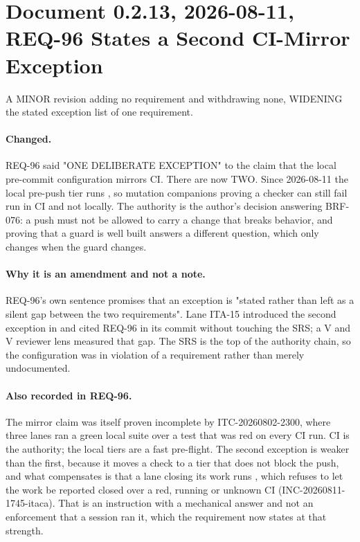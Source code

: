 \section*{Document 0.2.13, 2026-08-11, REQ-96 States a Second CI-Mirror Exception}

A MINOR revision adding no requirement and withdrawing none, WIDENING the
stated exception list of one \stable{} requirement.

\paragraph{Changed.} REQ-96 said "ONE DELIBERATE EXCEPTION" to the
claim that the local pre-commit configuration mirrors CI. There are now
TWO. Since 2026-08-11 the local pre-push tier runs , so mutation companions proving a checker can still fail run
in CI and not locally. The authority is the author's decision answering
BRF-076: a push must not be allowed to carry a change that breaks
behavior, and proving that a guard is well built answers a different
question, which only changes when the guard changes.

\paragraph{Why it is an amendment and not a note.} REQ-96's own sentence
promises that an exception is "stated rather than left as a silent gap
between the two requirements". Lane ITA-15 introduced the second exception
in  and cited REQ-96 in its commit without
touching the SRS; a V and V reviewer lens measured that gap. The SRS is
the top of the authority chain, so the configuration was in violation of a
\stable{} requirement rather than merely undocumented.

\paragraph{Also recorded in REQ-96.} The mirror claim was itself proven
incomplete by ITC-20260802-2300, where three lanes ran a green local suite
over a test that was red on every CI run. CI is the authority; the local
tiers are a fast pre-flight. The second exception is weaker than the
first, because it moves a check to a tier that does not block the push,
and what compensates is that a lane closing its work runs
, which refuses to let the work
be reported closed over a red, running or unknown CI
(INC-20260811-1745-itaca). That is an instruction with a mechanical
answer and not an enforcement that a session ran it, which the
requirement now states at that strength.

